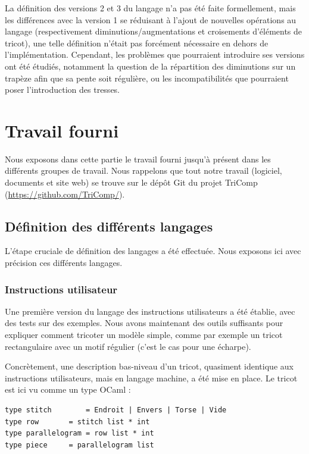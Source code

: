 \documentclass{article}
\begin{document}
La définition des versions 2 et 3 du langage n'a pas été faite formellement, mais les différences avec la version 1 se réduisant à l'ajout de 
nouvelles opérations au langage (respectivement diminutions/augmentations et croisements d'éléments de tricot), une telle définition n'était pas 
forcément nécessaire en dehors de l'implémentation. 
Cependant, les problèmes que pourraient introduire ses versions ont été étudiés, notamment la question de la répartition des diminutions sur un 
trapèze afin que sa pente soit régulière, ou les incompatibilités que pourraient poser l'introduction des tresses. 

\newpage

\section{Travail fourni}

Nous exposons dans cette partie le travail fourni jusqu'à présent dans les différents groupes de travail. Nous rappelons que tout notre travail (logiciel, documents et site web) se trouve sur le dépôt Git du projet TriComp (\url{https://github.com/TriComp/}).

\subsection{Définition des différents langages}

L'étape cruciale de définition des langages a été effectuée. Nous exposons ici avec précision ces différents langages.

\subsubsection{Instructions utilisateur}

Une première version du langage des instructions utilisateurs a été établie, avec des tests sur des exemples. Nous avons maintenant des outils
suffisants pour expliquer comment tricoter un modèle simple, comme par exemple un tricot rectangulaire avec un motif régulier (c'est le cas pour une écharpe). 

Concrètement, une description bas-niveau d'un tricot, quasiment identique aux instructions utilisateurs, mais en langage machine, a été mise en place.
Le tricot est ici vu comme un type OCaml :
\begin{lstlisting}
type stitch 	   = Endroit | Envers | Torse | Vide
type row 	   = stitch list * int
type parallelogram = row list * int
type piece 	   = parallelogram list
\end{lstlisting}
\end{document}
